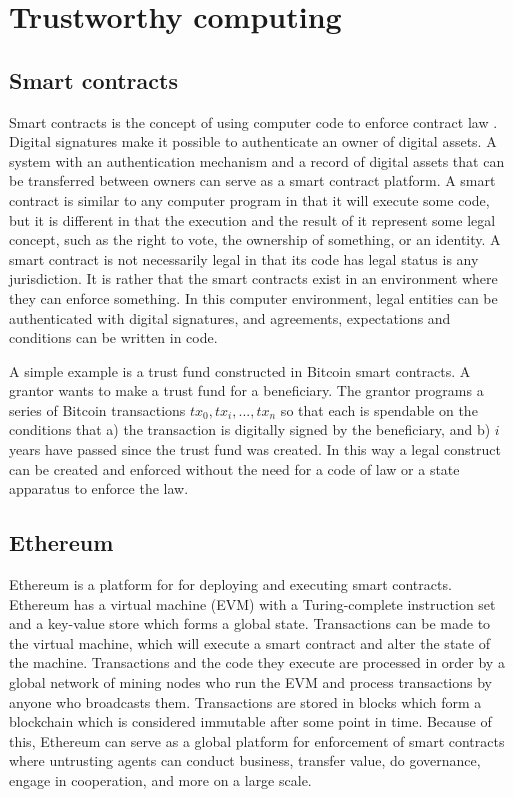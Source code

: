 \section{Trustworthy computing}
\label{sec:trustworthy}

\subsection{Smart contracts}

Smart contracts is the concept of using computer code to enforce contract law \cite{szabo_formalizing_1997}. Digital signatures make it possible to authenticate an owner of digital assets. A system with an authentication mechanism and a record of digital assets that can be transferred between owners can serve as a smart contract platform. A smart contract is similar to any computer program in that it will execute some code, but it is different in that the execution and the result of it represent some legal concept, such as the right to vote, the ownership of something, or an identity. A smart contract is not necessarily legal in that its code has legal status is any jurisdiction. It is rather that the smart contracts exist in an environment where they can enforce something. In this computer environment, legal entities can be authenticated with digital signatures, and agreements, expectations and conditions can be written in code.

A simple example is a trust fund constructed in Bitcoin smart contracts. A grantor wants to make a trust fund for a beneficiary. The grantor programs a series of Bitcoin transactions ${tx_0, tx_i, ..., tx_n}$ so that each is spendable on the conditions that a) the transaction is digitally signed by the beneficiary, and b) $i$ years have passed since the trust fund was created. In this way a legal construct can be created and enforced without the need for a code of law or a state apparatus to enforce the law.

\subsection{Ethereum}

Ethereum \cite{wood2018ethereum} is a platform for for deploying and executing smart contracts. Ethereum has a virtual machine (EVM) with a Turing-complete instruction set and a key-value store which forms a global state. Transactions can be made to the virtual machine, which will execute a smart contract and alter the state of the machine. Transactions and the code they execute are processed in order by a global network of mining nodes who run the EVM and process transactions by anyone who broadcasts them. Transactions are stored in blocks which form a blockchain which is considered immutable after some point in time. Because of this, Ethereum can serve as a global platform for enforcement of smart contracts where untrusting agents can conduct business, transfer value, do governance, engage in cooperation, and more on a large scale.

